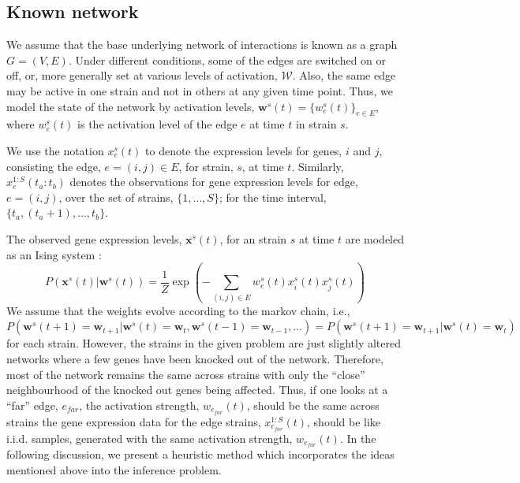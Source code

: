 \documentclass{bioinfo}
\begin{document}
\begin{methods}
\subsection{Known network}
We assume that the base underlying network of interactions is known as a
graph $G=(V,E)$. Under different conditions, some of the edges are 
switched on or off, or, more generally set at various levels of
activation, $\mathcal W$. Also, the same edge may be active in one
strain and not in others at any given time point. Thus, we model the
state of the network by activation levels, $\mathbf{w}^{s}(t) = \{w^s_{e}(t)\}_{e
\in E}$, where $w^s_{e}(t)$ is the activation level of the edge $e$ at time $t$ in strain $s$. 

We use the notation $x^{s}_{e}(t)$ to denote the expression
levels for genes, $i$ and $j$, consisting the edge, $e=(i,j)\in E$,
for strain, $s$, at time $t$. Similarly,  $x_{e}^{1:S}(t_{a}:t_{b})$
denotes the observations for gene expression levels for edge,
$e=(i,j)$, over the set of strains, $\{1,\ldots, S\}$; for the time
interval, $\{t_{a}, (t_{a}+1), \ldots, t_{b}\}$. 

The observed gene expression levels, $\mathbf{x}^{s}(t)$, for an strain
$s$ at time $t$ are modeled as an Ising system \cite{Song09KELLER}:
\begin{equation}
\label{eq:ising}
 P\left(\mathbf{x}^{s}(t) | \mathbf{w}^{s}(t)\right) = 
      \frac{1}{Z} \exp \left( - \sum_{(i,j) \in E} w^s_{e}(t)
        x^{s}_i(t) x^{s}_j(t)\right)  
\end{equation}
We assume that the weights evolve according to the markov chain, i.e.,
$P(\mathbf{w}^{s}(t+1) = \mathbf{w}_{t+1} |  \mathbf{w}^{s}(t) =
  \mathbf{w}_{t}, \mathbf{w}^{s}(t-1) = \mathbf{w}_{t-1},
  \ldots) = P\left(\mathbf{w}^{s}(t+1) = \mathbf{w}_{t+1} |  \mathbf{w}^{s}(t) =
  \mathbf{w}_{t}\right)$ for each strain. 
However, the strains in the given problem are just slightly altered
networks where a few genes have been knocked out of the
network. Therefore, most of the network remains the same across
strains with only the ``close'' neighbourhood of the knocked out genes
being affected. Thus, if one looks at a ``far'' edge,
$e_{far}$, the activation strength, $w_{e_{far}}(t)$, should be the
same across strains  the gene expression data for the edge strains,
$x^{1:S}_{e_{far}}(t)$, should be like i.i.d. samples, generated with
the same activation strength, $w_{e_{far}}(t)$. In the following discussion, 
we present a heuristic method which incorporates the ideas mentioned
above into the inference problem. 

\end{methods}
\end{document}
